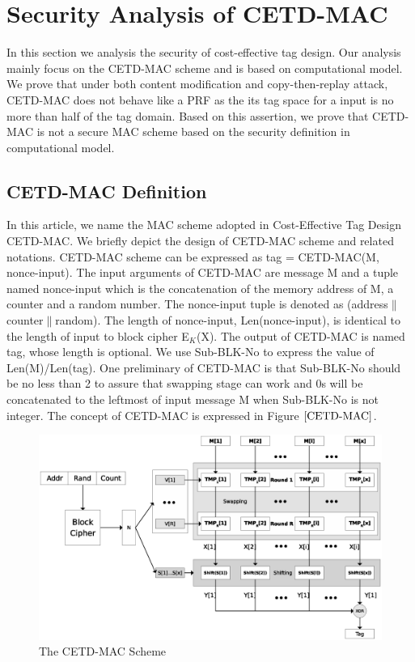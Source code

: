 

\section{Security Analysis of CETD-MAC}
In this section we analysis the security of cost-effective tag design. Our analysis mainly focus on the CETD-MAC scheme and is based on computational model. We prove that under both content modification and copy-then-replay attack, CETD-MAC does not behave like a PRF as the its tag space for a input is no more than half of the tag domain. Based on this assertion, we prove that CETD-MAC is not a secure MAC scheme based on the security definition in computational model.
\subsection{CETD-MAC Definition}
In this article, we name the MAC scheme adopted in Cost-Effective Tag Design\cite{} CETD-MAC. We briefly depict the design of CETD-MAC scheme and related notations.
CETD-MAC scheme can be expressed as tag = CETD-MAC(M, nonce-input). The input arguments of CETD-MAC are message M and a tuple named nonce-input which is the concatenation of the memory address of M, a counter and a random number. The nonce-input tuple is denoted as (address$\|$counter$\|$random). The length of nonce-input, Len(nonce-input), is identical to the length of input to block cipher E$_K$(X). The output of CETD-MAC is named tag, whose length is optional. We use Sub-BLK-No to express the value of Len(M)/Len(tag). One preliminary of CETD-MAC is that Sub-BLK-No should be no less than 2 to assure that swapping stage can work and 0s will be concatenated to the leftmost of input message M when Sub-BLK-No is not integer.  
The concept of CETD-MAC is expressed in Figure $\ref{CETD-MAC}$.
\begin{figure}[htbp]
 \centering
 \includegraphics[scale=0.6]{./diagrams/CETD.eps}
 \caption{The CETD-MAC Scheme}
 \label{fig:CETD-MAC}
\end{figure}

